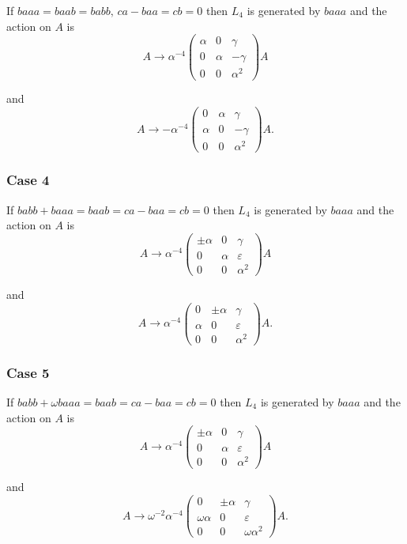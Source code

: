\documentclass[12pt]{article}
\begin{document}
If $baaa=baab=babb,\,ca-baa=cb=0$ then $L_{4}$ is generated by $baaa$ and
the action on $A$ is 
\[
A\rightarrow \alpha ^{-4}\left( 
\begin{array}{lll}
\alpha  & 0 & \gamma  \\ 
0 & \alpha  & -\gamma  \\ 
0 & 0 & \alpha ^{2}%
\end{array}%
\right) A
\]

and 
\[
A\rightarrow -\alpha ^{-4}\left( 
\begin{array}{lll}
0 & \alpha  & \gamma  \\ 
\alpha  & 0 & -\gamma  \\ 
0 & 0 & \alpha ^{2}%
\end{array}%
\right) A.
\]

\subsubsection{Case 4}

If $babb+baaa=baab=ca-baa=cb=0$ then $L_{4}$ is generated by $baaa$ and the
action on $A$ is 
\[
A\rightarrow \alpha ^{-4}\left( 
\begin{array}{lll}
\pm \alpha  & 0 & \gamma  \\ 
0 & \alpha  & \varepsilon  \\ 
0 & 0 & \alpha ^{2}%
\end{array}%
\right) A
\]

and 
\[
A\rightarrow \alpha ^{-4}\left( 
\begin{array}{lll}
0 & \pm \alpha  & \gamma  \\ 
\alpha  & 0 & \varepsilon  \\ 
0 & 0 & \alpha ^{2}%
\end{array}%
\right) A.
\]

\subsubsection{Case 5}

If $babb+\omega baaa=baab=ca-baa=cb=0$ then $L_{4}$ is generated by $baaa$
and the action on $A$ is 
\[
A\rightarrow \alpha ^{-4}\left( 
\begin{array}{lll}
\pm \alpha  & 0 & \gamma  \\ 
0 & \alpha  & \varepsilon  \\ 
0 & 0 & \alpha ^{2}%
\end{array}%
\right) A
\]

and 
\[
A\rightarrow \omega ^{-2}\alpha ^{-4}\left( 
\begin{array}{lll}
0 & \pm \alpha  & \gamma  \\ 
\omega \alpha  & 0 & \varepsilon  \\ 
0 & 0 & \omega \alpha ^{2}%
\end{array}%
\right) A.
\]
\end{document}
